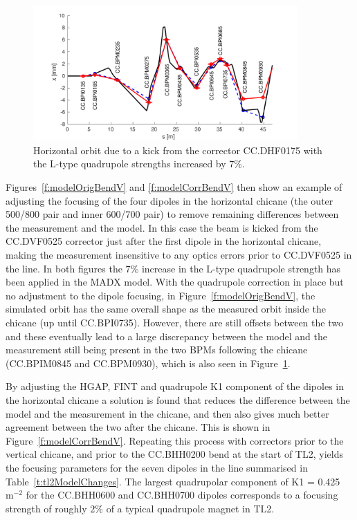 \begin{figure}
  \centering
  \includegraphics[width=0.9\textwidth]{Figures/optics/modelCorrQuadH}
  \caption{Horizontal orbit due to a kick from the corrector CC.DHF0175 with the L-type quadrupole strengths increased by \(7\%\).}
  \label{f:modelCorrQuadH}
\end{figure}

Figures~\ref{f:modelOrigBendV} and \ref{f:modelCorrBendV} then show an example of adjusting the focusing of the four dipoles in the horizontal chicane (the outer 500/800 pair and inner 600/700 pair) to remove remaining differences between the measurement and the model. In this case the beam is kicked from the CC.DVF0525 corrector just after the first dipole in the horizontal chicane, making the measurement insensitive to any optics errors prior to CC.DVF0525 in the line. In both figures the \(7\%\) increase in the L-type quadrupole strength has been applied in the MADX model. With the quadrupole correction in place but no adjustment to the dipole focusing, in Figure~\ref{f:modelOrigBendV}, the simulated orbit has the same overall shape as the measured orbit inside the chicane (up until CC.BPI0735). However, there are still offsets between the two and these eventually lead to a large discrepancy between the model and the measurement still being present in the two BPMs following the chicane (CC.BPIM0845 and CC.BPM0930), which is also seen in Figure~\ref{f:modelCorrQuadH}. 

By adjusting the HGAP, FINT and quadrupole K1 component of the dipoles in the horizontal chicane a solution is found that reduces the difference between the model and the measurement in the chicane, and then also gives much better agreement between the two after the chicane. This is shown in Figure~\ref{f:modelCorrBendV}. Repeating this process with correctors prior to the vertical chicane, and prior to the CC.BHH0200 bend at the start of TL2, yields the focusing parameters for the seven dipoles in the line summarised in Table~\ref{t:tl2ModelChanges}. The largest quadrupolar component of K1 = 0.425~\(\mathrm{m^{-2}}\) for the CC.BHH0600 and CC.BHH0700 dipoles corresponds to a focusing strength of roughly \(2\%\) of a typical quadrupole magnet in TL2.


